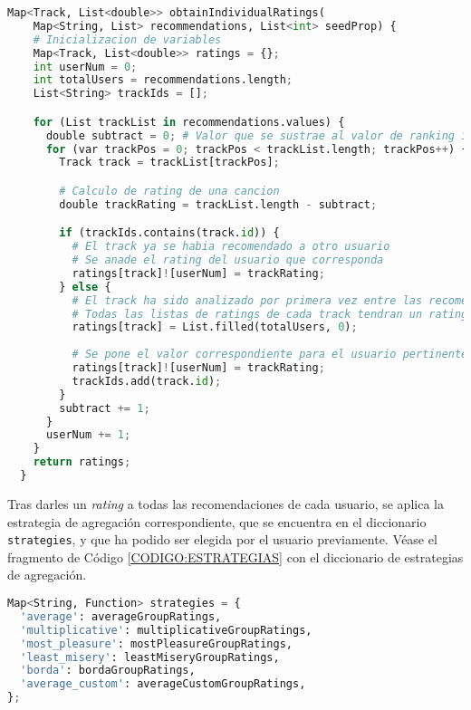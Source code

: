 \begin{lstlisting}[language=python, caption=Obtención de \textit{ratings} individuales, label=CODIGO:OBTENCION_RATINGS_INDIVIDUALES]
  Map<Track, List<double>> obtainIndividualRatings(
    Map<String, List> recommendations, List<int> seedProp) {
    # Inicializacion de variables
    Map<Track, List<double>> ratings = {};
    int userNum = 0;
    int totalUsers = recommendations.length;
    List<String> trackIds = [];

    for (List trackList in recommendations.values) {
      double subtract = 0; # Valor que se sustrae al valor de ranking invertido
      for (var trackPos = 0; trackPos < trackList.length; trackPos++) {
        Track track = trackList[trackPos];

        # Calculo de rating de una cancion
        double trackRating = trackList.length - subtract;

        if (trackIds.contains(track.id)) {
          # El track ya se habia recomendado a otro usuario
          # Se anade el rating del usuario que corresponda
          ratings[track]![userNum] = trackRating;
        } else {
          # El track ha sido analizado por primera vez entre las recomendaciones
          # Todas las listas de ratings de cada track tendran un rating de 0
          ratings[track] = List.filled(totalUsers, 0);
          
          # Se pone el valor correspondiente para el usuario pertinente
          ratings[track]![userNum] = trackRating;
          trackIds.add(track.id);
        }
        subtract += 1;
      }
      userNum += 1;
    }
    return ratings;
  }
\end{lstlisting}

Tras darles un \textit{rating} a todas las recomendaciones de cada usuario, se aplica la estrategia de agregación correspondiente, 
que se encuentra en el diccionario \texttt{strategies}, y que ha podido ser elegida por el usuario previamente. Véase el 
fragmento de Código \ref{CODIGO:ESTRATEGIAS} con el diccionario de estrategias de agregación.

\begin{lstlisting}[language=python, caption=Diccionario de estrategias de agregación, label=CODIGO:ESTRATEGIAS]
Map<String, Function> strategies = {
  'average': averageGroupRatings,
  'multiplicative': multiplicativeGroupRatings,
  'most_pleasure': mostPleasureGroupRatings,
  'least_misery': leastMiseryGroupRatings,
  'borda': bordaGroupRatings,
  'average_custom': averageCustomGroupRatings,
};
\end{lstlisting}

